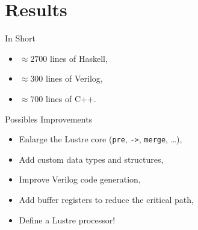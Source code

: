 \documentclass{beamer}
\begin{document}
\section{Results}

\begin{frame}{In Short}
    \begin{itemize}
        \setlength{\itemsep}{5pt}
        \item $\approx 2700$ lines of Haskell,
        \item $\approx 300$ lines of Verilog,
        \item $\approx 700$ lines of C++.
    \end{itemize}
\end{frame}

\begin{frame}{Possibles Improvements}
    \begin{itemize}
        \setlength{\itemsep}{5pt}
        \item Enlarge the Lustre core (\texttt{pre}, \texttt{->}, \texttt{merge}, \dots),
        \item Add custom data types and structures,
        \item Improve Verilog code generation,
        \item Add buffer registers to reduce the critical path,
        \item Define a Lustre processor!
    \end{itemize}
\end{frame}
\end{document}
